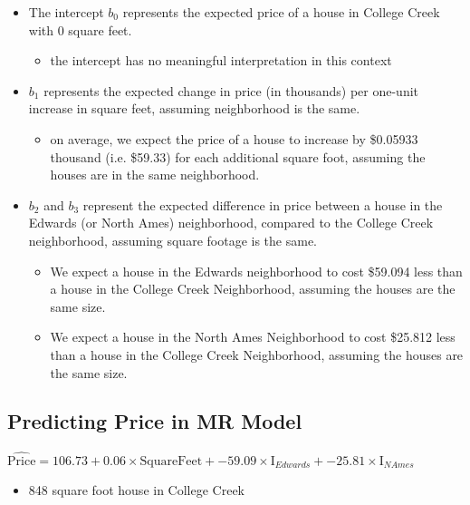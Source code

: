 \documentclass[]{book}
\providecommand{\tightlist}{%
  \setlength{\itemsep}{0pt}\setlength{\parskip}{0pt}}
\begin{document}
\begin{itemize}
\tightlist
\item
  The intercept \(b_0\) represents the expected price of a house in
  College Creek with 0 square feet.

  \begin{itemize}
  \tightlist
  \item
    the intercept has no meaningful interpretation in this context
  \end{itemize}
\item
  \(b_1\) represents the expected change in price (in thousands) per
  one-unit increase in square feet, assuming neighborhood is the same.

  \begin{itemize}
  \tightlist
  \item
    on average, we expect the price of a house to increase by \$0.05933
    thousand (i.e. \$59.33) for each additional square foot, assuming
    the houses are in the same neighborhood.\\
  \end{itemize}
\item
  \(b_2\) and \(b_3\) represent the expected difference in price between
  a house in the Edwards (or North Ames) neighborhood, compared to the
  College Creek neighborhood, assuming square footage is the same.

  \begin{itemize}
  \tightlist
  \item
    We expect a house in the Edwards neighborhood to cost \$59.094 less
    than a house in the College Creek Neighborhood, assuming the houses
    are the same size.\\
  \item
    We expect a house in the North Ames Neighborhood to cost \$25.812
    less than a house in the College Creek Neighborhood, assuming the
    houses are the same size.
  \end{itemize}
\end{itemize}

\subsection{Predicting Price in MR
Model}\label{predicting-price-in-mr-model}

\(\widehat{\text{Price}}= 106.73+ 0.06 \times\text{SquareFeet}+ -59.09 \times\text{I}_{Edwards} +-25.81 \times\text{I}_{NAmes}\)

\begin{itemize}
\tightlist
\item
  848 square foot house in College Creek
\end{itemize}
\end{document}
